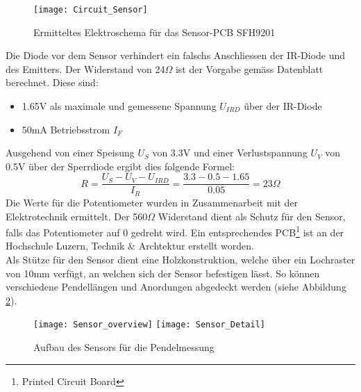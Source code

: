 	\begin{figure}[H]
		\centering
		\texttt{[image: Circuit\_Sensor]}
		\caption{Ermitteltes Elektroschema für das Sensor-PCB SFH9201}
		\label{fig:schema_sensor}
	\end{figure}
	\noindent Die Diode vor dem Sensor verhindert ein falschs Anschliessen der IR-Diode und des Emitters. Der Widerstand von 24$\Omega$ ist der Vorgabe gemäss Datenblatt berechnet. Diese sind:
	\begin{itemize}
		\item 1.65V als maximale und gemessene Spannung $U_{IRD}$ über der IR-Diode
		\item 50mA Betriebsstrom $I_F$
	\end{itemize}
	Ausgehend von einer Speisung $U_S$ von 3.3V und einer Verlustspannung $U_V$ von 0.5V über der Sperrdiode ergibt dies folgende Formel:
	\[
		R = \frac{U_S - U_V - U_{IRD}}{I_R} = \frac{3.3 - 0.5 - 1.65}{0.05} = 23\Omega
	\]
	Die Werte für die Potentiometer wurden in Zusammenarbeit mit der Elektrotechnik ermittelt. Der 560$\Omega$ Widerstand dient als Schutz für den Sensor, falls das Potentiometer auf 0 gedreht wird. Ein entsprechendes PCB\footnote{Printed Circuit Board} ist an der Hochschule Luzern, Technik \& Archtektur erstellt worden.\\
	Als Stütze für den Sensor dient eine Holzkonstruktion, welche über ein Lochraster von 10mm verfügt, an welchen sich der Sensor befestigen lässt. So können verschiedene Pendellängen und Anordungen abgedeckt werden (siehe Abbildung \ref{fig:Sensor_overview}).
	\begin{figure}[H]
		\centering
		\texttt{[image: Sensor\_overview]}
		\texttt{[image: Sensor\_Detail]}
		\caption{Aufbau des Sensors für die Pendelmessung}
		\label{fig:Sensor_overview}
	\end{figure}